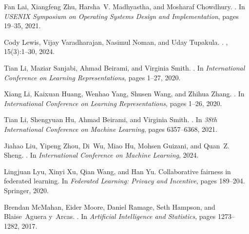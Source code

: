 \documentclass{article}
\begin{document}
\begin{thebibliography}{}
Fan Lai, Xiangfeng Zhu, Harsha~V. Madhyastha, and Mosharaf Chowdhury.
.
\newblock In {\em {USENIX} Symposium on Operating Systems Design and Implementation}, pages 19--35, 2021.

Cody Lewis, Vijay Varadharajan, Nasimul Noman, and Uday Tupakula.
.
, 15(3):1--30, 2024.

Tian Li, Maziar Sanjabi, Ahmad Beirami, and Virginia Smith.
.
\newblock In {\em {International Conference on Learning Representations}}, pages 1--27, 2020.

Xiang Li, Kaixuan Huang, Wenhao Yang, Shusen Wang, and Zhihua Zhang.
.
\newblock In {\em {International Conference on Learning Representations}}, pages 1--26, 2020.

Tian Li, Shengyuan Hu, Ahmad Beirami, and Virginia Smith.
.
\newblock In {\em {38th International Conference on Machine Learning}}, pages 6357--6368, 2021.

Jiahao Liu, Yipeng Zhou, Di~Wu, Miao Hu, Mohsen Guizani, and Quan~Z. Sheng.
.
\newblock In {\em {International Conference on Machine Learning}}, 2024.

Lingjuan Lyu, Xinyi Xu, Qian Wang, and Han Yu.
\newblock Collaborative fairness in federated learning.
\newblock In {\em Federated Learning: Privacy and Incentive}, pages 189--204. Springer, 2020.

Brendan McMahan, Eider Moore, Daniel Ramage, Seth Hampson, and Blaise~Aguera y~Arcas.
.
\newblock In {\em {Artificial Intelligence and Statistics}}, pages 1273--1282, 2017.


\end{thebibliography}
\end{document}

